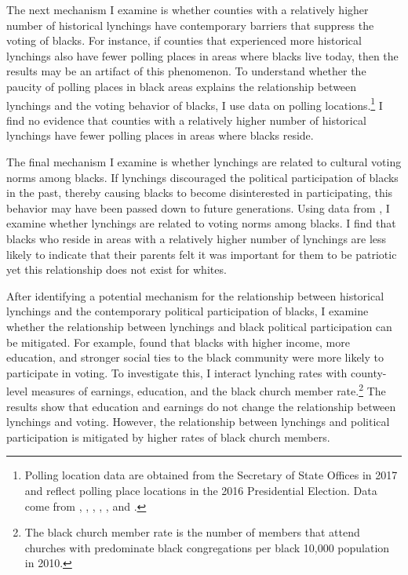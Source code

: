 \documentclass[AEJ, finalmode]{AEA}
\begin{document}
The next mechanism I examine is whether counties with a relatively higher number of historical lynchings have contemporary barriers that suppress the voting of blacks. For instance, if counties that experienced more historical lynchings also have fewer polling places in areas where blacks live today, then the results may be an artifact of this phenomenon. To understand whether the paucity of polling places in black areas explains the relationship between lynchings and the voting behavior of blacks, I use data on polling locations.\footnote{Polling location data are obtained from the Secretary of State Offices in 2017 and reflect polling place locations in the 2016 Presidential Election. Data come from , , , , , and .} I find no evidence that counties with a relatively higher number of historical lynchings have fewer polling places in areas where blacks reside.


The final mechanism I examine is whether lynchings are related to cultural voting norms among blacks. If lynchings discouraged the political participation of blacks in the past, thereby causing blacks to become disinterested in participating, this behavior may have been passed down to future generations. Using data from , I examine whether lynchings are related to voting norms among blacks. I find that blacks who reside in areas with a relatively higher number of lynchings are less likely to indicate that their parents felt it was important for them to be patriotic yet this relationship does not exist for whites.


After identifying a potential mechanism for the relationship between historical lynchings and the contemporary political participation of blacks, I examine whether the relationship between lynchings and black political participation can be mitigated. For example,  found that blacks with higher income, more education, and stronger social ties to the black community were more likely to participate in voting. To investigate this, I interact lynching rates with county-level measures of earnings, education, and the black church member rate.\footnote{The black church member rate is the number of members that attend churches with predominate black congregations per black 10,000 population in 2010.} The results show that education and earnings do not change the relationship between lynchings and voting. However, the relationship between lynchings and political participation is mitigated by higher rates of black church members. 
\end{document}
